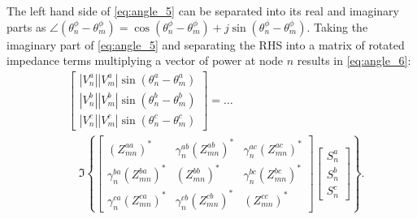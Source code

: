 The left hand side of \eqref{eq:angle_5} can be separated into its real and imaginary parts as $\angle \left( \theta_{n}^{\phi} - \theta_{m}^{\phi} \right) = \cos \left( \theta_{n}^{\phi} - \theta_{m}^{\phi} \right) + j \sin \left( \theta_{n}^{\phi} - \theta_{m}^{\phi} \right) $. Taking the imaginary part of \eqref{eq:angle_5} and separating the RHS into a matrix of rotated impedance terms multiplying a vector of power at node $n$ results in \eqref{eq:angle_6}:
\begin{align}
	& \begin{bmatrix}
    	\left| V_{n}^{a} \right| \left| V_{m}^{a} \right| \sin \left( \theta_{n}^{a} - \theta_{m}^{a} \right) \\
        \left| V_{n}^{b} \right| \left| V_{m}^{b} \right| \sin \left( \theta_{n}^{b} - \theta_{m}^{b} \right) \\
        \left| V_{n}^{c} \right| \left| V_{m}^{c} \right| \sin \left( \theta_{n}^{c} - \theta_{m}^{c} \right)
    \end{bmatrix}
	= \ldots \nonumber \\
    & \quad \Im \left\{
    \begin{bmatrix}
    	{\left( Z_{mn}^{aa} \right)}^{*} & \gamma_{n}^{ab} {\left( Z_{mn}^{ab} \right)}^{*} & \gamma_{n}^{ac} {\left( Z_{mn}^{ac} \right)}^{*} \\
        \gamma_{n}^{ba} {\left( Z_{mn}^{ba} \right)}^{*} & {\left( Z_{mn}^{bb} \right)}^{*} & \gamma_{n}^{bc} {\left( Z_{mn}^{bc} \right)}^{*} \\
        \gamma_{n}^{ca} {\left( Z_{mn}^{ca} \right)}^{*} & \gamma_{n}^{cb} {\left( Z_{mn}^{cb} \right)}^{*} & {\left( Z_{mn}^{cc} \right)}^{*}
    \end{bmatrix}
    \begin{bmatrix}
    	S_{n}^{a} \\
        S_{n}^{b} \\
        S_{n}^{c}
    \end{bmatrix}
    \right\}
    \label{eq:angle_6}.
\end{align}

